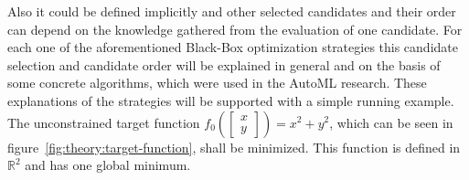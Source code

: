 Also it could be defined implicitly and other selected candidates and their order can depend on the knowledge gathered from the evaluation of one candidate.\newline
For each one of the aforementioned Black-Box optimization strategies this candidate selection and candidate order will be explained in general and on the basis of some concrete algorithms, which were used in the AutoML research.
These explanations of the strategies will be supported with a simple running example.
The unconstrained target function $f_0(\begin{bmatrix}x\\y \end{bmatrix}) = x^2 + y^2$, which can be seen in figure~\ref{fig:theory:target-function}, shall be minimized.
This function is defined in $\mathbb{R}^2$ and has one global minimum.
